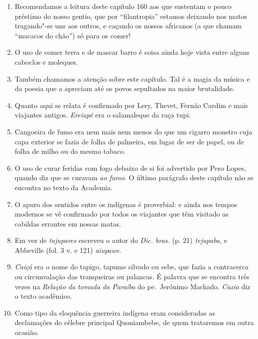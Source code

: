 \begin{enumerate}
\item Recomendamos a leitura deste capítulo 160 aos que sustentam o pouco préstimo do 
nosso gentio, que por ``filantropia'' estamos deixando nos matos tragando"-se uns aos 
outros, e caçando os nossos africanos (a que chamam ``macacos do chão'') só para os 
comer!

\item O uso de comer terra e de mascar barro é coisa ainda hoje vista entre alguns 
caboclos e moleques.

\item Também chamamos a atenção sobre este capítulo. Tal é a magia da música e da 
poesia que a apreciam até os povos sepultados na maior brutalidade.

\item Quanto aqui se relata é confirmado por Lery, Thevet, Fernão Cardim e mais 
viajantes antigos. \textit{Ereiupê} era o salamaleque da raça tupi.

\item Cangoeira de fumo era nem mais nem menos do que um cigarro monstro cuja capa 
exterior se fazia de folha de palmeira, em lugar de ser de papel, ou de folha de milho ou 
do mesmo tabaco.

\item O uso de curar feridas com fogo debaixo de si foi advertido por Pero Lopes, 
quando diz que se curavam \textit{ao fumo}. O último parágrafo deste capítulo não se encontra no texto da Academia.

\item O apuro dos sentidos entre os indígenas é proverbial: e ainda nos tempos modernos 
se vê confirmado por todos os viajantes que têm visitado as cabildas errantes em nossas 
matas.

\item Em vez de \textit{tajupares} escreveu o autor do \textit{Dic. bras.} (p. 21) \textit{tejupaba}, e Abbeville 
(fol. 3 v. e 121) \textit{aiupawe}.

\item \textit{Caiçá} era o nome do tapigo, tapume silvado ou sebe, que fazia a contracerca ou 
circunvalação das tranqueiras ou palancas. É palavra que se encontra três vezes na  
\textit{Relação da tomada da Paraíba} do pe.~Jerónimo Machado.  \textit{Cazia} diz o texto acadêmico.

\item Como tipo da eloquência guerreira indígena eram consideradas as declamações do 
célebre principal Quoniambebe, de quem trataremos em outra ocasião.


\end{enumerate}
